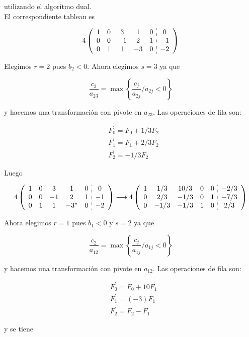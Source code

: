 \documentclass[10pt]{article}
\begin{document}
utilizando el algoritmo dual.\\
El correspondiente tableau es

$$
4\left(\begin{array}{ccccc:c}
1 & 0 & 3 & 1 & 0 & 0 \\
0 & 0 & -1 & 2 & 1 & -1 \\
0 & 1 & 1 & -3 & 0 & -2
\end{array}\right)
$$

Elegimos $r=2$ pues $b_{2}<0$. Ahora elegimos $s=3$ ya que

$$
\frac{c_{3}}{a_{23}}=\max \left\{\frac{c_{j}}{a_{2 j}} / a_{2 j}<0\right\}
$$

y hacemos una transformación con pivote en $a_{23}$. Las operaciones de fila son:

$$
\begin{aligned}
& F_{0}^{\prime}=F_{0}+1 / 3 F_{2} \\
& F_{1}^{\prime}=F_{1}+2 / 3 F_{2} \\
& F_{2}^{\prime}=-1 / 3 F_{2}
\end{aligned}
$$

Luego

$$
4\left(\begin{array}{ccccc:c}
1 & 0 & 3 & 1 & 0 & 0 \\
0 & 0 & -1 & 2 & 1 & -1 \\
0 & 1 & 1 & -3^{*} & 0 & -2
\end{array}\right) \longrightarrow 4\left(\begin{array}{ccccc:c}
1 & 1 / 3 & 10 / 3 & 0 & 0 & -2 / 3 \\
0 & 2 / 3 & -1 / 3 & 0 & 1 & -7 / 3 \\
0 & -1 / 3 & -1 / 3 & 1 & 0 & 2 / 3
\end{array}\right)
$$

Ahora elegimos $r=1$ pues $b_{1}<0$ y $s=2$ ya que

$$
\frac{c_{2}}{a_{12}}=\max \left\{\frac{c_{j}}{a_{1 j}} / a_{1 j}<0\right\}
$$

y hacemos una transformación con pivote en $a_{12}$. Las operaciones de fila son:

$$
\begin{aligned}
& F_{0}^{\prime}=F_{0}+10 F_{1} \\
& F_{1}^{\prime}=(-3) F_{1} \\
& F_{2}^{\prime}=F_{2}-F_{1}
\end{aligned}
$$

y se tiene
\end{document}
